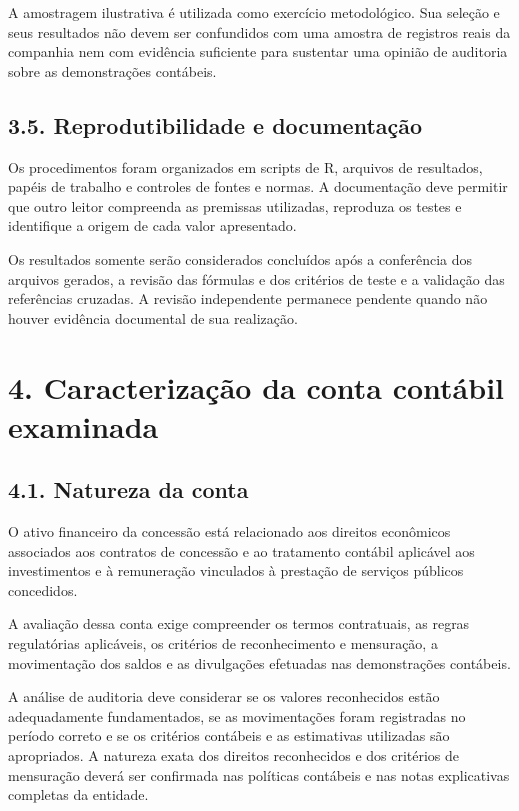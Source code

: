 \documentclass[
]{article}
\begin{document}
A amostragem ilustrativa é utilizada como exercício metodológico. Sua
seleção e seus resultados não devem ser confundidos com uma amostra de
registros reais da companhia nem com evidência suficiente para sustentar
uma opinião de auditoria sobre as demonstrações contábeis.

\subsection{3.5. Reprodutibilidade e
documentação}\label{reprodutibilidade-e-documentauxe7uxe3o}

Os procedimentos foram organizados em scripts de R, arquivos de
resultados, papéis de trabalho e controles de fontes e normas. A
documentação deve permitir que outro leitor compreenda as premissas
utilizadas, reproduza os testes e identifique a origem de cada valor
apresentado.

Os resultados somente serão considerados concluídos após a conferência
dos arquivos gerados, a revisão das fórmulas e dos critérios de teste e
a validação das referências cruzadas. A revisão independente permanece
pendente quando não houver evidência documental de sua realização.

\section{4. Caracterização da conta contábil
examinada}\label{caracterizauxe7uxe3o-da-conta-contuxe1bil-examinada}

\subsection{4.1. Natureza da conta}\label{natureza-da-conta}

O ativo financeiro da concessão está relacionado aos direitos econômicos
associados aos contratos de concessão e ao tratamento contábil aplicável
aos investimentos e à remuneração vinculados à prestação de serviços
públicos concedidos.

A avaliação dessa conta exige compreender os termos contratuais, as
regras regulatórias aplicáveis, os critérios de reconhecimento e
mensuração, a movimentação dos saldos e as divulgações efetuadas nas
demonstrações contábeis.

A análise de auditoria deve considerar se os valores reconhecidos estão
adequadamente fundamentados, se as movimentações foram registradas no
período correto e se os critérios contábeis e as estimativas utilizadas
são apropriados. A natureza exata dos direitos reconhecidos e dos
critérios de mensuração deverá ser confirmada nas políticas contábeis e
nas notas explicativas completas da entidade.
\end{document}
